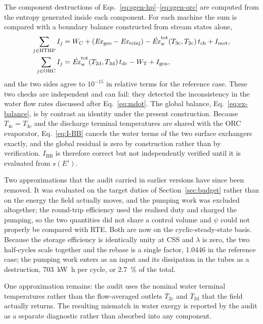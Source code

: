 The component destructions of Eqs.~\eqref{eq:sgen-hp}--\eqref{eq:sgen-orc} are
computed from the entropy generated inside each component. For each machine
the sum is compared with a boundary balance constructed from stream states
alone,
\begin{align}
  \sum_{j\in\mathrm{HTHP}}I_j&=W_\mathrm{C}+\left(\mathit{Ex}_\mathrm{geo}-\mathit{Ex}_\mathrm{reinj}\right)
    -\dot{\mathit{Ex}}_\mathrm{w}^\mathrm{tot}\!\left(T_\mathrm{3c},T_\mathrm{2c}\right)t_\mathrm{ch}
    +I_\mathrm{mot},
  \label{eq:gate-hp}\\
  \sum_{j\in\mathrm{ORC}}I_j&=\dot{\mathit{Ex}}_\mathrm{w}^\mathrm{tot}\!\left(T_\mathrm{2d},T_\mathrm{3d}\right)t_\mathrm{dc}
    -W_\mathrm{T}+I_\mathrm{gen},
  \label{eq:gate-orc}
\end{align}
and the two sides agree to $10^{-15}$ in relative terms for the reference
case. These two checks are independent and can fail: they detected the
inconsistency in the water flow rates discussed after Eq.~\eqref{eq:mdot}.
The global balance, Eq.~\eqref{eq:ex-balance}, is by contrast an identity
under the present construction. Because $T_\mathrm{4c}=T_\mathrm{3c}$ and the
discharge terminal temperatures are shared with the ORC evaporator,
Eq.~\eqref{eq:I-BB} cancels the water terms of the two surface exchangers
exactly, and the global residual is zero by construction rather than by
verification. $I_\mathrm{BB}$ is therefore correct but not independently
verified until it is evaluated from $s(E')$.

Two approximations that the audit carried in earlier versions have since been
removed. It was evaluated on the target duties of Section~\ref{sec:budget}
rather than on the energy the field actually moves, and the pumping work was
excluded altogether; the round-trip efficiency used the realised duty and
charged the pumping, so the two quantities did not share a control volume and
$\psi$ could not properly be compared with RTE. Both are now on the
cyclic-steady-state basis. Because the storage efficiency is identically unity
at CSS and $\lambda$ is zero, the two half-cycles scale together and the
rebase is a single factor, \num{1.0446} in the reference case; the pumping
work enters as an input and its dissipation in the tubes as a destruction,
\SI{703}{\kilo\watt\hour} per cycle, or \SI{2.7}{\percent} of the total.

One approximation remains: the audit uses the nominal water terminal
temperatures rather than the flow-averaged outlets
$\overline{T}_\mathrm{2c}$ and $\overline{T}_\mathrm{2d}$ that the field
actually returns. The resulting mismatch in water exergy is reported by the
audit as a separate diagnostic rather than absorbed into any component.

